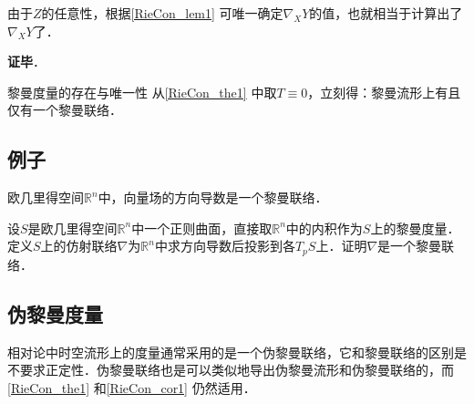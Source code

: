 由于$Z$的任意性，根据\autoref{RieCon_lem1} 可唯一确定$\nabla_XY$的值，也就相当于计算出了$\nabla_XY$了．

\textbf{证毕}．

\begin{corollary}{黎曼度量的存在与唯一性}\label{RieCon_cor1}
从\autoref{RieCon_the1} 中取$T\equiv 0$，立刻得：黎曼流形上有且仅有一个黎曼联络．
\end{corollary}

\subsection{例子}

\begin{example}{}
欧几里得空间$\mathbb{R}^n$中，向量场的方向导数是一个黎曼联络．
\end{example}


\begin{exercise}{}
设$S$是欧几里得空间$\mathbb{R}^n$中一个正则曲面，直接取$\mathbb{R}^n$中的内积作为$S$上的黎曼度量．定义$S$上的仿射联络$\nabla$为$\mathbb{R}^n$中求方向导数后投影到各$T_pS$上．证明$\nabla$是一个黎曼联络．
\end{exercise}

\subsection{伪黎曼度量}

相对论中时空流形上的度量通常采用的是一个伪黎曼联络，它和黎曼联络的区别是不要求正定性．伪黎曼联络也是可以类似地导出伪黎曼流形和伪黎曼联络的，而\autoref{RieCon_the1} 和\autoref{RieCon_cor1} 仍然适用．





